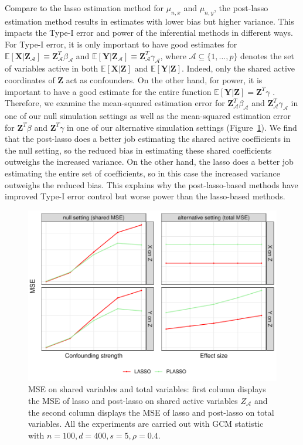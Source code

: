 \documentclass[12pt]{article}
\theoremstyle{definition}
\theoremstyle{remark}
\newcommand{\E}{\mathbb E}								%
\newcommand{\prx}{\bm X}								%
\newcommand{\prz}{\bm Z}								%
\newcommand{\pry}{{\bm Y}}								%
\begin{document}
Compare to the lasso estimation method for $\mu_{n,x}$ and $\mu_{n,y}$, the post-lasso estimation method results in estimates with lower bias but higher variance. This impacts the Type-I error and power of the inferential methods in different ways. For Type-I error, it is only important to have good estimates for $\E[\prx|\prz_{\mathcal A}] \equiv \prz_{\mathcal A}^T\beta_{\mathcal A}$ and $\E[\pry|\prz_{\mathcal A}] \equiv \prz_{\mathcal A}^T \gamma_{\mathcal A}$, where $\mathcal A \subseteq \{1, \dots, p\}$ denotes the set of variables active in both $\E[\prx|\prz]$ and $\E[\pry|\prz]$. Indeed, only the shared active coordinates of $\prz$ act as confounders. On the other hand, for power, it is important to have a good estimate for the entire function $\E[\pry|\prz] = \prz^T \gamma$  \citep{Katsevich2020a}. Therefore, we examine the mean-squared estimation error for $\prz_{\mathcal A}^T\beta_{\mathcal A}$ and $\prz_{\mathcal A}^T\gamma_{\mathcal A}$ in one of our null simulation settings as well as the mean-squared estimation error for $\prz^T \beta$ and $\prz^T\gamma$ in one of our alternative simulation settings (Figure~\ref{fig:MSE}). We find that the post-lasso does a better job estimating the shared active coefficients in the null setting, so the reduced bias in estimating these shared coefficients outweighs the increased variance. On the other hand, the lasso does a better job estimating the entire set of coefficients, so in this case the increased variance outweighs the reduced bias. This explains why the post-lasso-based methods have improved Type-I error control but worse power than the lasso-based methods.

\begin{figure}[!ht]
	\centering
	\includegraphics[scale = 1]{figures/MSE.pdf}
	\caption{MSE on shared variables and total variables: first column displays the MSE of lasso and post-lasso on shared active variables $Z_{\mathcal{A}}$ and the second column displays the MSE of lasso and post-lasso on total variables. All the experiments are carried out with GCM statistic with $n=100,d=400,s=5,\rho=0.4$.}
	\label{fig:MSE}
\end{figure}
\end{document}
